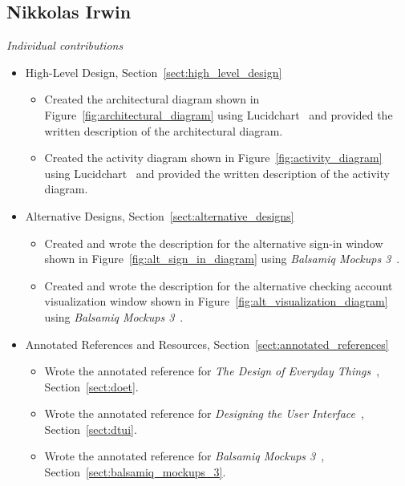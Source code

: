 \subsection{Nikkolas Irwin}
\emph{Individual contributions}
\begin{itemize}
    \item {High-Level Design, Section~\ref{sect:high_level_design}}
        \begin{itemize}
            \item {Created the architectural diagram shown in Figure~\ref{fig:architectural_diagram} using Lucidchart~\cite{LUCID_CHART:2} and provided the written description of the architectural diagram.}
            \item {Created the activity diagram shown in Figure~\ref{fig:activity_diagram}  using Lucidchart~\cite{LUCID_CHART:2} and provided the written description of the activity diagram.}
        \end{itemize}{}
    \item {Alternative Designs, Section~\ref{sect:alternative_designs}}
        \begin{itemize}
            \item {Created and wrote the description for the alternative sign-in window shown in Figure~\ref{fig:alt_sign_in_diagram} using \emph{Balsamiq Mockups 3}~\cite{BALSAMIQ_MOCKUPS_3:1}.}
            \item {Created and wrote the description for the alternative checking account visualization window shown in Figure~\ref{fig:alt_visualization_diagram} using \emph{Balsamiq Mockups 3}~\cite{BALSAMIQ_MOCKUPS_3:1}.}
        \end{itemize}
    \item {Annotated References and Resources, Section~\ref{sect:annotated_references}}
        \begin{itemize}
            \item {Wrote the annotated reference for \emph{The Design of Everyday Things}~\cite{THE_DESIGN_OF_EVERYDAY_THINGS:0}, Section~\ref{sect:doet}.}
            \item {Wrote the annotated reference for \emph{Designing the User Interface}~\cite{DESIGNING_THE_USER_INTERFACE:6}, Section~\ref{sect:dtui}.}
            \item {Wrote the annotated reference for \emph{Balsamiq Mockups 3}~\cite{BALSAMIQ_MOCKUPS_3:1}, Section~\ref{sect:balsamiq_mockups_3}.}

\end{itemize}
\end{itemize}
